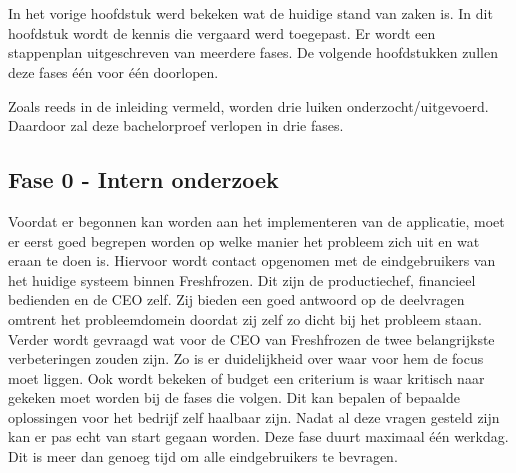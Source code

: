 
\chapter{}%
\label{ch:methodologie}



In het vorige hoofdstuk werd bekeken wat de huidige stand van zaken is. In dit hoofdstuk wordt de kennis die vergaard werd toegepast. Er wordt een stappenplan uitgeschreven van meerdere fases. De volgende hoofdstukken zullen deze fases één voor één doorlopen.

Zoals reeds in de inleiding vermeld, worden drie luiken onderzocht/uitgevoerd. Daardoor zal deze bachelorproef verlopen in drie fases.
\section{Fase 0 - Intern onderzoek}
Voordat er begonnen kan worden aan het implementeren van de applicatie, moet er eerst goed begrepen worden op welke manier het probleem zich uit en wat eraan te doen is. Hiervoor wordt contact opgenomen met de eindgebruikers van het huidige systeem binnen Freshfrozen. Dit zijn de productiechef, financieel bedienden en de CEO zelf. Zij bieden een goed antwoord op de deelvragen omtrent het probleemdomein doordat zij zelf zo dicht bij het probleem staan. Verder wordt gevraagd wat voor de CEO van Freshfrozen de twee belangrijkste verbeteringen zouden zijn. Zo is er duidelijkheid over waar voor hem de focus moet liggen. Ook wordt bekeken of budget een criterium is waar kritisch naar gekeken moet worden bij de fases die volgen. Dit kan bepalen of bepaalde oplossingen voor het bedrijf zelf haalbaar zijn. Nadat al deze vragen gesteld zijn kan er pas echt van start gegaan worden. Deze fase duurt maximaal één werkdag. Dit is meer dan genoeg tijd om alle eindgebruikers te bevragen.
